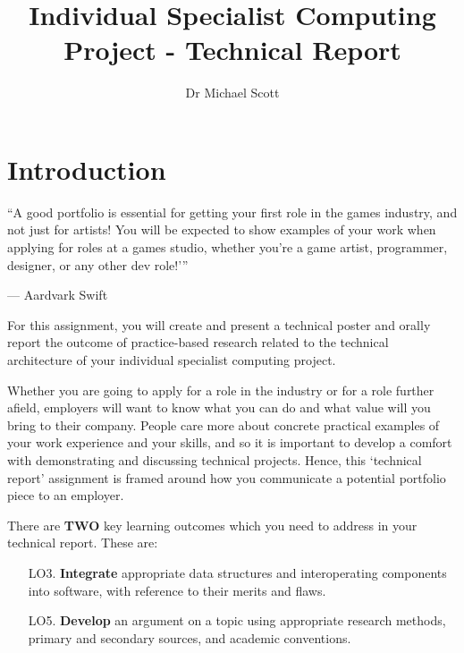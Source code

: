 \documentclass{../../fal_assignment}
\title{Individual Specialist Computing Project - Technical Report}
\author{Dr Michael Scott}
\begin{document}
\maketitle

\section*{Introduction}

\begin{marginquote}
``A good portfolio is essential for getting your first role in the games industry, and not just for artists! You will be expected to show examples of your work when applying for roles at a games studio, whether you’re a game artist, programmer, designer, or any other dev role!'\thinspace''

--- Aardvark Swift
\end{marginquote}

For this assignment, you will create and present a technical poster and orally report the outcome of practice-based research related to the technical architecture of your individual specialist computing project.

Whether you are going to apply for a role in the industry or for a role further afield, employers will want to know what you can do and what value will you bring
to their company. People care more about concrete practical examples of your work experience and your skills, and so it is important to develop a comfort with demonstrating
and discussing technical projects. Hence, this `technical report' assignment is framed around how you communicate a potential portfolio piece to an employer.
 
There are \textbf{TWO} key learning outcomes which you need to address in your technical report. These are:

\begin{itemize}
	\setlength{\itemindent}{1em}
	\item[LO3. ] \textbf{Integrate} appropriate data structures and interoperating components into software, with reference to their merits and flaws.
	\item[LO5. ] \textbf{Develop} an argument on a topic using appropriate research methods, primary and secondary sources, and academic conventions.
\end{itemize}
\end{document}
